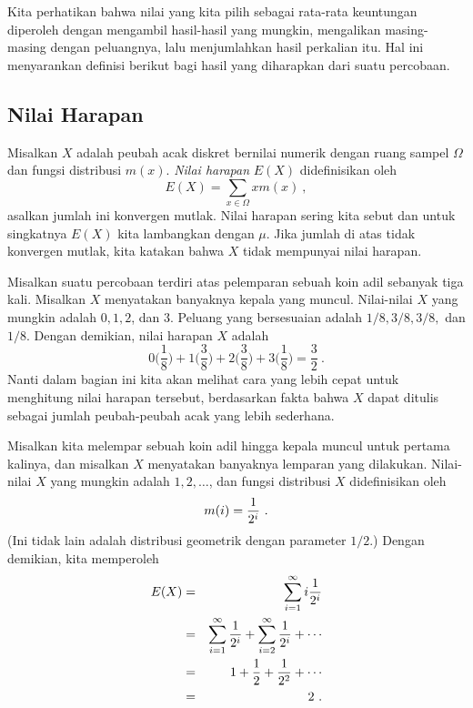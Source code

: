 Kita perhatikan bahwa nilai yang kita pilih sebagai rata-rata keuntungan diperoleh
dengan mengambil hasil-hasil yang mungkin, mengalikan masing-masing dengan peluangnya,
lalu menjumlahkan hasil perkalian itu. Hal ini menyarankan definisi berikut bagi hasil
yang diharapkan dari suatu percobaan.

\subsection*{Nilai Harapan}

\begin{definition}\label{def 6.1} Misalkan $X$ adalah peubah acak diskret bernilai
numerik dengan ruang sampel $\Omega$ dan fungsi distribusi $m(x)$. {\em Nilai
harapan} $E(X)$ didefinisikan oleh
$$ E(X) = \sum_{x \in \Omega} x m(x)\ ,
$$ asalkan jumlah ini konvergen mutlak. Nilai harapan sering kita sebut
 dan untuk singkatnya $E(X)$ kita lambangkan dengan
$\mu$. Jika jumlah di atas tidak konvergen mutlak, kita katakan bahwa $X$ tidak
mempunyai nilai harapan.
\end{definition}

\begin{example}\label{exam 6.03} Misalkan suatu percobaan terdiri atas pelemparan
sebuah koin adil sebanyak tiga kali. Misalkan $X$ menyatakan banyaknya kepala yang
muncul. Nilai-nilai $X$ yang mungkin adalah $0, 1, 2$, dan $3$. Peluang yang
bersesuaian adalah $1/8, 3/8, 3/8,$ dan $1/8$. Dengan demikian, nilai harapan $X$
adalah
$$0\biggl(\frac 18\biggr) + 1\biggl(\frac 38\biggr) + 2\biggl(\frac 38\biggr) +
3\biggl(\frac 18\biggr) = \frac 32\ .$$ Nanti dalam bagian ini kita akan melihat
cara yang lebih cepat untuk menghitung nilai harapan tersebut, berdasarkan fakta bahwa
$X$ dapat ditulis sebagai jumlah peubah-peubah acak yang lebih sederhana.
\end{example}


\begin{example}\label{exam 6.05} Misalkan kita melempar sebuah koin adil hingga
kepala muncul untuk pertama kalinya, dan misalkan $X$ menyatakan banyaknya lemparan
yang dilakukan. Nilai-nilai $X$ yang mungkin adalah $1, 2, \ldots$, dan fungsi
distribusi $X$ didefinisikan oleh
$$m(i) = {1\over {2^i}}\ .$$ (Ini tidak lain adalah distribusi geometrik dengan
parameter $1/2$.) Dengan demikian, kita memperoleh
\begin{eqnarray*}  E(X) & = &\sum_{i = 1}^\infty i {1\over{2^i}} \\ & = & \sum_{i =
1}^\infty {1\over{2^i}} + \sum_{i = 2}^\infty {1\over{2^i}} + \cdots \\ & = & 1 +
{1\over 2} + {1\over{2^2}} + \cdots \\ & = & 2\ .
\end{eqnarray*}

\end{example}

